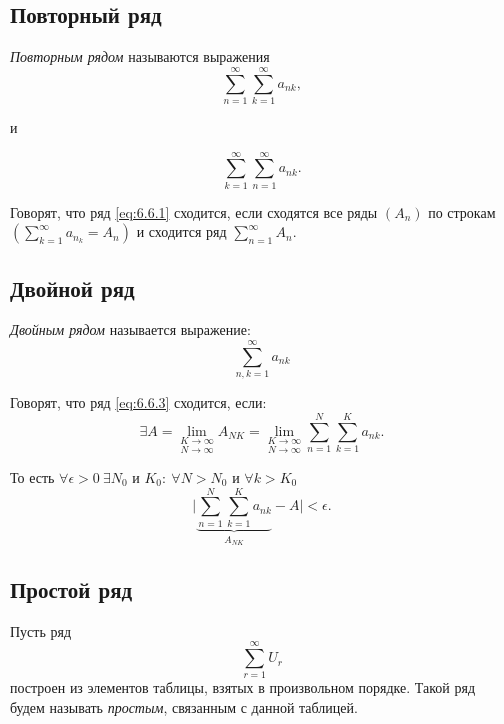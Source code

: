 \subsection{Повторный ряд}

\begin{definition}
    \emph{Повторным рядом} называются выражения
    \begin{equation}\label{eq:6.6.1}
        \sum_{n=1}^{\infty}\sum_{k=1}^{\infty}a_{nk},
    \end{equation}
    \begin{center}
        и
    \end{center}
    \begin{equation}\label{eq:6.6.2}
        \sum_{k=1}^{\infty}\sum_{n=1}^{\infty}a_{nk}.
    \end{equation}

    Говорят, что ряд \ref{eq:6.6.1} сходится, если сходятся все ряды $(A_n)$ по строкам $(\sum_{k=1}^{\infty}a_{n_k} = A_n)$ и сходится ряд $ \sum_{n=1}^{\infty}A_n $.
\end{definition}

\subsection{Двойной ряд}

\begin{definition}
    \emph{Двойным рядом} называется выражение:
    \begin{equation}\label{eq:6.6.3}
        \sum_{n,k = 1}^{\infty} a_{nk}
    \end{equation}

    Говорят, что ряд \ref{eq:6.6.3} сходится, если:
    \[
        \exists A = \underset{N\rightarrow\infty}{\underset{K\rightarrow\infty}{\lim}}A_{NK} = \underset{N\rightarrow\infty}{\underset{K\rightarrow\infty}{\lim}}\sum_{n=1}^{N}\sum_{k=1}^{K}a_{nk}.
    \]

    То есть $\forall \epsilon > 0 \ \exists N_0$ и $K_0: \ \forall N > N_0$ и $\forall k > K_0$
    \[
        \bigg|\underbrace{\sum_{n=1}^{N}\sum_{k=1}^{K}a_{nk}}_{A_{NK}} - A\bigg| < \epsilon.
    \]
\end{definition}

\subsection{Простой ряд}

\begin{definition}
    Пусть ряд
    \begin{equation}\label{eq:6.6.4}
        \sum_{r=1}^{\infty}U_r
    \end{equation}
    построен из элементов таблицы, взятых в произвольном порядке. Такой ряд будем называть \emph{простым}, связанным с данной таблицей.
\end{definition}

